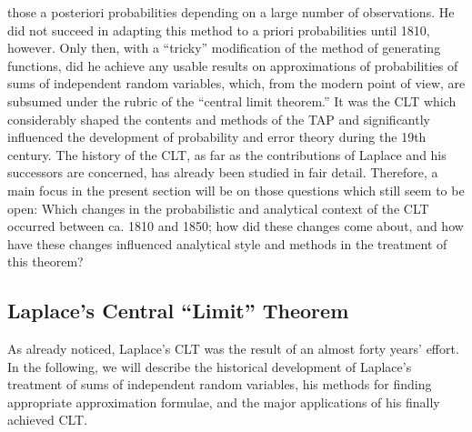 \documentclass{article}
\begin{document}
those a posteriori probabilities depending on a large number of observations. He did
not succeed in adapting this method to a priori probabilities until 1810, however.
Only then, with a “tricky” modification of the method of generating functions, did
he achieve any usable results on approximations of probabilities of sums of independent random variables, which, from the modern point of view, are subsumed under
the rubric of the “central limit theorem.” It was the CLT which considerably shaped
the contents and methods of the TAP and significantly influenced the development
of probability and error theory during the 19th century.
The history of the CLT, as far as the contributions of Laplace and his successors are concerned, has already been studied in
fair detail. Therefore, a main focus in the present section will be on those questions
which still seem to be open: Which changes in the probabilistic and analytical context of the CLT occurred between ca. 1810 and 1850; how did these changes come
about, and how have these changes influenced analytical style and methods in the
treatment of this theorem?
\subsection{Laplace’s Central “Limit” Theorem}
As already noticed, Laplace’s CLT was the result of an almost forty years’ effort.
In the following, we will describe the historical development of Laplace’s treatment
of sums of independent random variables, his methods for finding appropriate approximation formulae, and the major applications of his finally achieved CLT.
\end{document}
